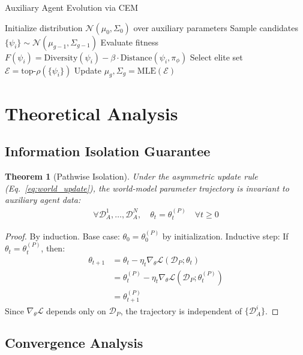 \documentclass[12pt, a4paper]{article}
\newtheorem{theorem}{Theorem}
\begin{document}
\begin{algorithm}[H]
\caption{Auxiliary Agent Evolution via CEM}
\begin{algorithmic}[1]
\STATE Initialize distribution $\mathcal{N}(\mu_0, \Sigma_0)$ over auxiliary parameters
  \STATE Sample candidates $\{\psi_i\} \sim \mathcal{N}(\mu_{g-1}, \Sigma_{g-1})$
  \STATE Evaluate fitness $F(\psi_i) = \text{Diversity}(\psi_i) - \beta \cdot \text{Distance}(\psi_i, \pi_\phi)$
  \STATE Select elite set $\mathcal{E} = \text{top-}\rho(\{\psi_i\})$
  \STATE Update $\mu_g, \Sigma_g = \text{MLE}(\mathcal{E})$
\ENDFOR
\end{algorithmic}
\end{algorithm}

\section{Theoretical Analysis}

\subsection{Information Isolation Guarantee}

\begin{theorem}[Pathwise Isolation]\label{thm:isolation}
Under the asymmetric update rule (Eq.~\ref{eq:world_update}), the world-model parameter trajectory is invariant to auxiliary agent data:
\begin{align}
\forall \mathcal{D}_A^1, \ldots, \mathcal{D}_A^N, \quad \theta_t = \theta_t^{(P)} \quad \forall t \geq 0
\end{align}
\end{theorem}

\begin{proof}
By induction. Base case: $\theta_0 = \theta_0^{(P)}$ by initialization. Inductive step: If $\theta_t = \theta_t^{(P)}$, then:
\begin{align}
\theta_{t+1} &= \theta_t - \eta_t \nabla_\theta \mathcal{L}(\mathcal{D}_P; \theta_t)\\
&= \theta_t^{(P)} - \eta_t \nabla_\theta \mathcal{L}(\mathcal{D}_P; \theta_t^{(P)})\\
&= \theta_{t+1}^{(P)}
\end{align}
Since $\nabla_\theta \mathcal{L}$ depends only on $\mathcal{D}_P$, the trajectory is independent of $\{\mathcal{D}_A^i\}$.
\end{proof}

\subsection{Convergence Analysis}
\end{document}
